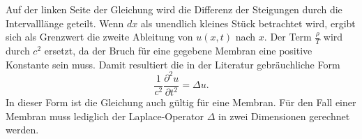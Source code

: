 Auf der linken Seite der Gleichung wird die Differenz der Steigungen durch die Intervalllänge geteilt.
Wenn $ dx $ als unendlich kleines Stück betrachtet wird, ergibt sich als Grenzwert die zweite Ableitung von $ u(x,t) $ nach $ x $. 
Der Term $ \frac{\rho}{T} $ wird durch $ c^2 $ ersetzt, da der Bruch für eine gegebene Membran eine positive Konstante sein muss. 
Damit resultiert die in der Literatur gebräuchliche Form 
\begin{equation}
	\label{kreismembran:Ausgang_DGL}
	\frac{1}{c^2}\frac{\partial^2u}{\partial t^2} = \Delta u.
\end{equation}
In dieser Form ist die Gleichung auch gültig für eine Membran. 
Für den Fall einer Membran muss lediglich der Laplace-Operator $\Delta$ in zwei Dimensionen gerechnet werden.